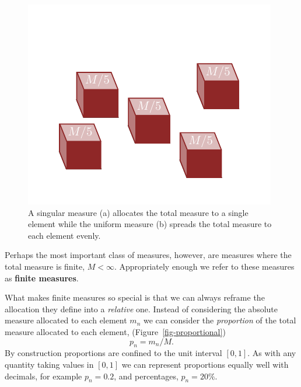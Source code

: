 \documentclass[
  letterpaper,
  DIV=11,
  numbers=noendperiod]{scrartcl}
\begin{document}
\begin{figure}
\begin{minipage}[t]{0.50\linewidth}
{{\includegraphics{figures/uniform_measure/uniform_measure.pdf}

}

}

\subcaption{\label{fig-types_of_measureb}}
\end{minipage}%

\caption{\label{fig-types_of_measure}A singular measure (a) allocates
the total measure to a single element while the uniform measure (b)
spreads the total measure to each element evenly.}

\end{figure}

Perhaps the most important class of measures, however, are measures
where the total measure is finite, \(M < \infty\). Appropriately enough
we refer to these measures as \textbf{finite measures}.

What makes finite measures so special is that we can always reframe the
allocation they define into a \emph{relative} one. Instead of
considering the absolute measure allocated to each element \(m_{n}\) we
can consider the \emph{proportion} of the total measure allocated to
each element, (Figure~\ref{fig-proportional}) \[
p_{n} = m_{n} / M.
\] By construction proportions are confined to the unit interval
\([0, 1]\). As with any quantity taking values in \([0, 1]\) we can
represent proportions equally well with decimals, for example
\(p_{n} = 0.2\), and percentages, \(p_{n} = 20\%\).
\end{document}
